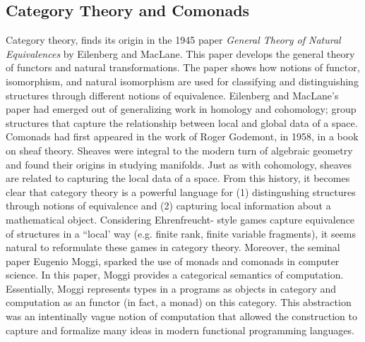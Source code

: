 \subsection{Category Theory and Comonads}
Category theory, finds its origin in the 1945 paper \textit{General Theory of Natural Equivalences} by Eilenberg and MacLane. This paper develops the general theory of functors and natural transformations. The paper shows how notions of functor, isomorphism, and natural isomorphism are used for classifying and distinguishing structures through different notions of equivalence. Eilenberg and MacLane's paper had emerged out of generalizing work in homology and cohomology; group structures that capture the relationship between local and global data of a space. Comonads had first appeared in the work of Roger Godemont, in 1958, in a book on sheaf theory. Sheaves were integral to the modern turn of algebraic geometry and found their origins in studying manifolds. Just as with cohomology, sheaves are related to capturing the local data of a space. From this history, it becomes clear that category theory is a powerful language for (1) distingushing structures through notions of equivalence and (2) capturing local information about a mathematical object. Considering Ehrenfreucht-{\Fraisse} style games capture equivalence of structures in a ``local' way (e.g. finite rank, finite variable fragments), it seems natural to reformulate these games in category theory. Moreover, the seminal paper \cite{Moggi1991} Eugenio Moggi, sparked the use of monads and comonads in computer science. In this paper, Moggi provides a categorical semantics of computation. Essentially, Moggi represents types in a programs as objects in category and computation as an functor (in fact, a monad) on this category. This abstraction was an intentinally vague notion of computation that allowed the construction to capture and formalize many ideas in modern functional programming languages.  
